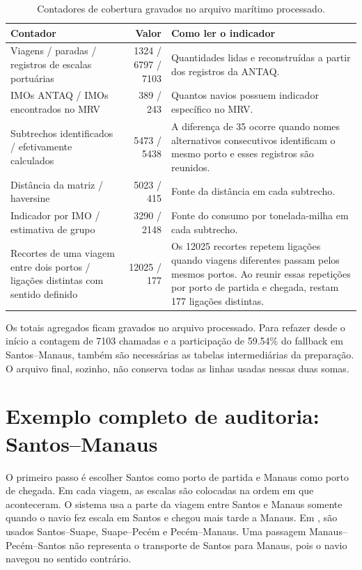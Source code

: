 \begin{table}[htbp]
\centering
\small
\caption{Contadores de cobertura gravados no arquivo marítimo processado.}
\label{tab:app-contadores-maritimos}
\begin{tabularx}{\textwidth}{Y r Y}
\toprule
Contador & Valor & Como ler o indicador \\
\midrule
Viagens / paradas / registros de escalas portuárias & \num{1324} / \num{6797} / \num{7103} & Quantidades lidas e reconstruídas a partir dos registros da ANTAQ.\\
IMOs ANTAQ / IMOs encontrados no MRV & \num{389} / \num{243} & Quantos navios possuem indicador específico no MRV.\\
Subtrechos identificados / efetivamente calculados & \num{5473} / \num{5438} & A diferença de 35 ocorre quando nomes alternativos consecutivos identificam o mesmo porto e esses registros são reunidos.\\
Distância da matriz / haversine & \num{5023} / \num{415} & Fonte da distância em cada subtrecho.\\
Indicador por IMO / estimativa de grupo & \num{3290} / \num{2148} & Fonte do consumo por tonelada-milha em cada subtrecho.\\
Recortes de uma viagem entre dois portos / ligações distintas com sentido definido & \num{12025} / \num{177} & Os \num{12025} recortes repetem ligações quando viagens diferentes passam pelos mesmos portos. Ao reunir essas repetições por porto de partida e chegada, restam \num{177} ligações distintas.\\
\bottomrule
\end{tabularx}
\end{table}

Os totais agregados ficam gravados no arquivo processado. Para refazer desde o início a contagem de \num{7103} chamadas e a participação de \num{59.54}\% do fallback em Santos--Manaus, também são necessárias as tabelas intermediárias da preparação. O arquivo final, sozinho, não conserva todas as linhas usadas nessas duas somas.

\section{Exemplo completo de auditoria: Santos--Manaus}
\label{sec:app-santos-manaus}

O primeiro passo é escolher Santos como porto de partida e Manaus como porto de chegada. Em cada viagem, as escalas são colocadas na ordem em que aconteceram. O sistema usa a parte da viagem entre Santos e Manaus somente quando o navio fez escala em Santos e chegou mais tarde a Manaus. Em , são usados Santos--Suape, Suape--Pecém e Pecém--Manaus. Uma passagem Manaus--Pecém--Santos não representa o transporte de Santos para Manaus, pois o navio navegou no sentido contrário.


